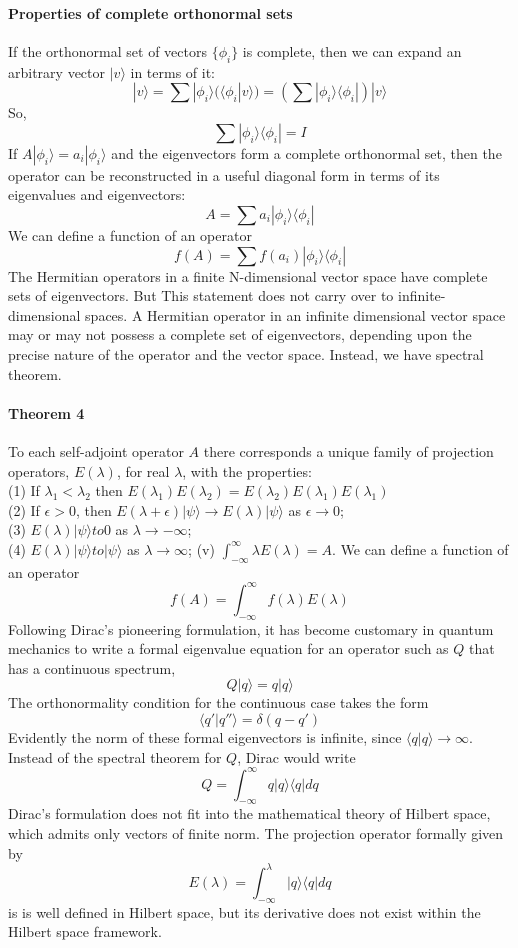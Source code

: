 \documentclass{article}
\begin{document}
\paragraph{Properties of complete orthonormal sets}
If the orthonormal set of vectors $\{ \phi_i \}$ is complete, then we can expand an arbitrary vector $|v\rangle$ in terms of it:
\[ |v\rangle = \sum | \phi_i \rangle (\langle \phi_i | v \rangle) = \left( \sum |\phi_i \rangle \langle \phi_i | \right) | v\rangle\]
So,
\[ \sum |\phi_i \rangle \langle \phi_i | = I\]
If $A |\phi_i \rangle = a_i |\phi_i\rangle$ and the eigenvectors form a complete orthonormal set, then the operator can be reconstructed in a useful diagonal form in terms of its eigenvalues and eigenvectors:
\[A = \sum a_i |\phi_i \rangle \langle \phi_i |\]
We can define a function of an operator
\[f(A) =  \sum f(a_i) |\phi_i \rangle \langle \phi_i |\]
The Hermitian operators in a finite N-dimensional vector space have complete sets of eigenvectors. But This statement does not carry over to infinite-dimensional spaces. A Hermitian operator in an infinite dimensional vector space may or may not possess a complete set of eigenvectors, depending upon the precise nature of the operator and the vector space. Instead, we have spectral theorem.
\paragraph{Theorem 4} To each self-adjoint operator $A$ there corresponds a unique family of projection operators, $E(\lambda)$, for real $\lambda$, with the properties:\\
(1) If $\lambda_1 < \lambda_2$ then $E(\lambda_1)E(\lambda_2) = E(\lambda_2)E(\lambda_1) E(\lambda_1) $\\
(2) If $\epsilon > 0$, then $E(\lambda + \epsilon)|\psi\rangle \to E(\lambda)|\psi\rangle$ as $\epsilon \to 0$;\\
(3) $E(\lambda)|\psi\rangle to 0$ as $\lambda \to -\infty$;\\
(4) $E(\lambda)|\psi\rangle to |\psi\rangle$ as $\lambda \to \infty$;
(v) $\int_{-\infty}^{\infty} \lambda E(\lambda) = A$.
We can define a function of an operator
\[f(A) = \int_{-\infty}^{\infty} f(\lambda) E(\lambda)\]
Following Dirac’s pioneering formulation, it has become customary in
quantum mechanics to write a formal eigenvalue equation for an operator such as $Q$ that has a continuous spectrum,
\[Q |q\rangle = q|q\rangle\]
The orthonormality condition for the continuous case takes the form
\[\langle q' | q'' \rangle = \delta(q-q')\]
Evidently the norm of these formal eigenvectors is infinite, since 
$\langle q | q \rangle \to \infty$. Instead of the spectral theorem for $Q$, Dirac would write
\[Q = \int_{-\infty}^{\infty} q |q\rangle\langle q| dq\]
Dirac’s formulation does not fit into the mathematical theory of Hilbert space, which admits only vectors of finite norm. The projection operator formally given by
\[E(\lambda) = \int_{-\infty}^{\lambda}  |q\rangle\langle q| dq\]
is is well defined in Hilbert space, but its derivative does not
exist within the Hilbert space framework.
\end{document}
